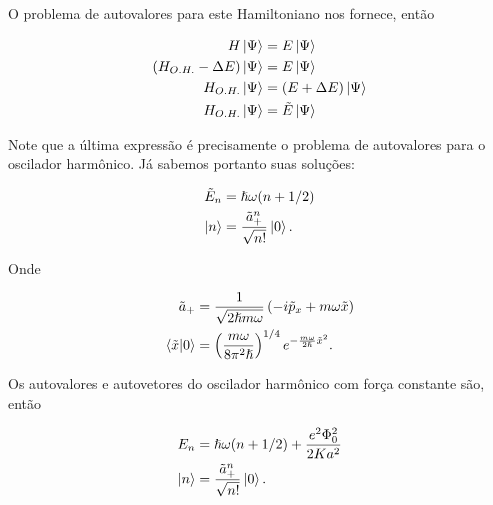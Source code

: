 \documentclass[a4paper, 12pt, notitlepage]{article}
\begin{document}
\begin{enumerate}
\begin{enumerate}[(A)]
  O problema de autovalores para este Hamiltoniano nos fornece, então
  
  \begin{align*}
    H\ket{\Psi} &= E\ket{\Psi} \\
    (H_{O.H.} - \Delta E)\ket{\Psi} &= E\ket{\Psi} \\
    H_{O.H.} \ket{\Psi} &= (E + \Delta E) \ket{\Psi} \\
    H_{O.H.} \ket{\Psi} &= \tilde{E} \ket{\Psi}    
  \end{align*}
  
  Note que a última expressão é precisamente o problema de autovalores para o oscilador harmônico. Já sabemos portanto suas soluções:

  \begin{align*}
    \tilde{E}_n &= \hslash \omega(n + 1/2) \\
    \ket{n} &= \frac{\tilde{a}_+^n}{\sqrt{n!}} \ket{0}.
  \end{align*}
  
  Onde
  
  \begin{align*}
  \tilde{a}_+ &= \frac{1}{\sqrt{2\hslash m \omega}}\left(-i\tilde{p}_x + m\omega \tilde{x}\right) \\
  \bra{\tilde{x}}\ket{0} &= \left(\frac{m\omega}{8\pi^2\hslash}\right)^{1/4} e^{-\frac{m\omega}{2\hslash} \tilde{x}^2}.
  \end{align*}
  
  Os autovalores e autovetores do oscilador harmônico com força constante são, então
  
  \begin{align*}
  E_n &= \hslash\omega(n + 1/2) + \frac{e^2 \Phi_0^2}{2Ka^2} \\
  \ket{n} &= \frac{\tilde{a}_+^n}{\sqrt{n!}} \ket{0}.
  \end{align*}
  
  \end{enumerate}



\end{enumerate}
\end{document}

